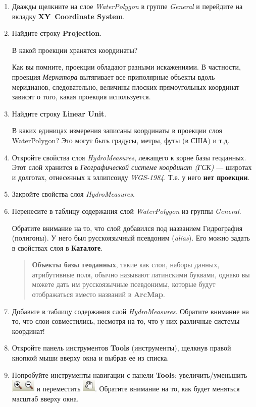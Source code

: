 \documentclass[]{book}
\theoremstyle{definition}
\theoremstyle{definition}
\theoremstyle{definition}
\theoremstyle{remark}
\begin{document}
\begin{enumerate}
\def\labelenumi{\arabic{enumi}.}
\item
  Дважды щелкните на слое \emph{WaterPolygon} в группе \emph{General} и
  перейдите на вкладку \textbf{XY~Coordinate System}.
\item
  Найдите строку \textbf{Projection}.

  В какой проекции хранятся координаты?

  Как вы помните, проекции обладают разными искажениями. В частности,
  проекция \emph{Меркатора} вытягивает все приполярные объекты вдоль
  меридианов, следовательно, величины плоских прямоугольных координат
  зависят о того, какая проекция используется.
\item
  Найдите строку \textbf{Linear Unit}.

  В каких единицах измерения записаны координаты в проекции слоя
  WaterPolygon? Это могут быть градусы, метры, футы (в США) и т.д.
\item
  Откройте свойства слоя \emph{HydroMeasures}, лежащего к корне базы
  геоданных. Этот слой хранится в \emph{Географической системе координат
  (ГСК)} --- широтах и долготах, отнесенных к эллипсоиду
  \emph{WGS-1984}. Т.е. у него \textbf{нет проекции}.
\item
  Закройте свойства слоя \emph{HydroMeasures}.
\item
  Перенесите в таблицу содержания слой \emph{WaterPolygon} из группы
  \emph{General}.

  Обратите внимание на то, что слой добавился под названием Гидрография
  (полигоны). У него был русскоязычный псевдоним (\emph{alias}). Его
  можно задать в свойствах слоя в \textbf{Каталоге}.

  \begin{quote}
  \textbf{Объекты базы геоданных}, такие как слои, наборы данных,
  атрибутивные поля, обычно называют латинскими буквами, однако вы
  можете дать им русскоязычные псевдонимы, которые будут отображаться
  вместо названий в \textbf{ArcMap}.
  \end{quote}
\item
  Добавьте в таблицу содержания слой \emph{HydroMeasures}. Обратите
  внимание на то, что слои совместились, несмотря на то, что у них
  различные системы координат!
\item
  Откройте панель инструментов \textbf{Tools} (инструменты), щелкнув
  правой кнопкой мыши вверху окна и выбрав ее из списка.
\item
  Попробуйте инструменты навигации с панели \textbf{Tools}:
  увеличить/уменьшить \includegraphics{images/Ex01/image12.png} и
  переместить \includegraphics{images/Ex01/image13.png}. Обратите
  внимание на то, как будет меняться масштаб вверху окна.


\end{enumerate}
\end{document}

